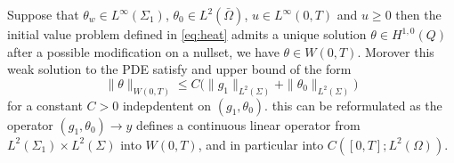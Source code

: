 \begin{corollary}[Existence]
Suppose that $\theta_w \in L^{\infty}(\Sigma_1)$, $\theta_0 \in L^2(\bar{\Omega})$, $u \in L^{\infty}(0,T)$ and $u\geq 0$ then the initial value problem defined in \eqref{eq:heat} admits a unique solution $\theta \in H^{1,0}(Q)$ after a possible modification on a nullset, we have $\theta \in W(0,T)$. Morover this weak solution to the PDE satisfy and upper bound of the form 
\begin{equation*}
    \|\theta \|_{W(0,T)} \leq C\bigg ( \|g_1\|_{L^2(\Sigma)} + \|\theta_0\|_{L^2(\Sigma)} \bigg )
\end{equation*}
for a constant $C>0$ indepdentent on $(g_1, \theta_0)$. this can be reformulated as the operator $(g_1,\theta_0) \rightarrow y$ defines a continuous linear operator from $L^2(\Sigma_1)\times L^2(\Sigma)$ into $W(0,T)$, and in particular into $C([0,T];L^2(\Omega))$.  
\end{corollary}

